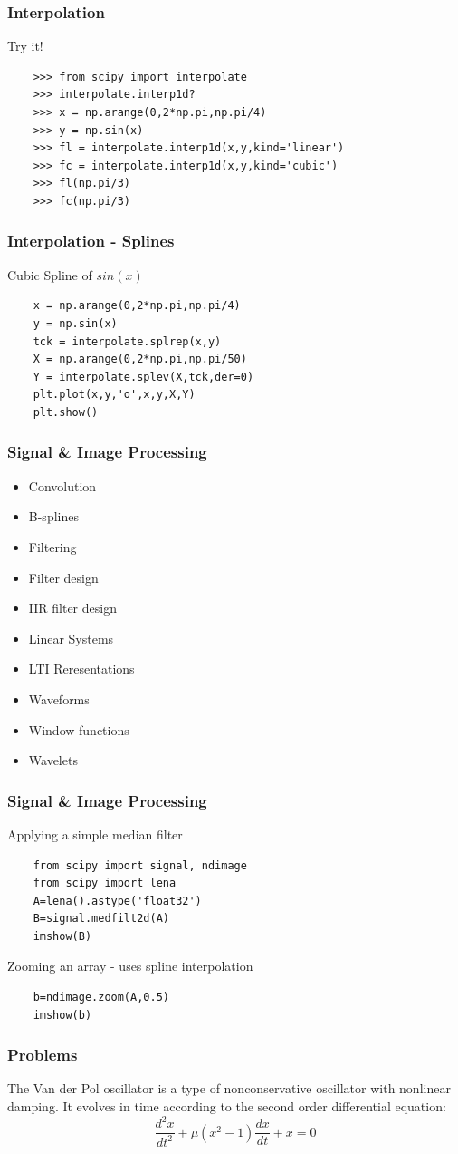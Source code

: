 \documentclass[14pt,compress]{beamer}
\newcounter{time}
\newcommand{\inctime}[1]{\addtocounter{time}{#1}{\tiny \thetime\ m}}
\begin{document}
\begin{frame}[fragile]
  \frametitle{Interpolation}
  Try it!
  \begin{lstlisting}
    >>> from scipy import interpolate
    >>> interpolate.interp1d?
    >>> x = np.arange(0,2*np.pi,np.pi/4)
    >>> y = np.sin(x)
    >>> fl = interpolate.interp1d(x,y,kind='linear')
    >>> fc = interpolate.interp1d(x,y,kind='cubic')
    >>> fl(np.pi/3)
    >>> fc(np.pi/3)
  \end{lstlisting}
\end{frame}

\begin{frame}[fragile]
  \frametitle{Interpolation - Splines}
  Cubic Spline of $sin(x)$
  \begin{lstlisting}
    x = np.arange(0,2*np.pi,np.pi/4)
    y = np.sin(x)
    tck = interpolate.splrep(x,y)
    X = np.arange(0,2*np.pi,np.pi/50)
    Y = interpolate.splev(X,tck,der=0)
    plt.plot(x,y,'o',x,y,X,Y)
    plt.show()
  \end{lstlisting}
\inctime{10}
\end{frame}

\begin{frame}[fragile]
  \frametitle{Signal \& Image Processing}
    \begin{itemize}
     \item Convolution
     \item B-splines
     \item Filtering
     \item Filter design
     \item IIR filter design
     \item Linear Systems
     \item LTI Reresentations
     \item Waveforms
     \item Window functions
     \item Wavelets
    \end{itemize}
\end{frame}

\begin{frame}[fragile]
  \frametitle{Signal \& Image Processing}
  Applying a simple median filter
  \begin{lstlisting}
    from scipy import signal, ndimage
    from scipy import lena
    A=lena().astype('float32')
    B=signal.medfilt2d(A)
    imshow(B)
  \end{lstlisting}
  Zooming an array - uses spline interpolation
  \begin{lstlisting}
    b=ndimage.zoom(A,0.5)
    imshow(b)
  \end{lstlisting}
    \inctime{5}
\end{frame}

\begin{frame}[fragile]
  \frametitle{Problems}
  The Van der Pol oscillator is a type of nonconservative oscillator with nonlinear damping. It evolves in time according to the second order differential equation:
  \begin{equation*}
  \frac{d^2x}{dt^2}+\mu(x^2-1)\frac{dx}{dt}+x= 0
  \end{equation*}
\inctime{25}
\end{frame}
\end{document}
